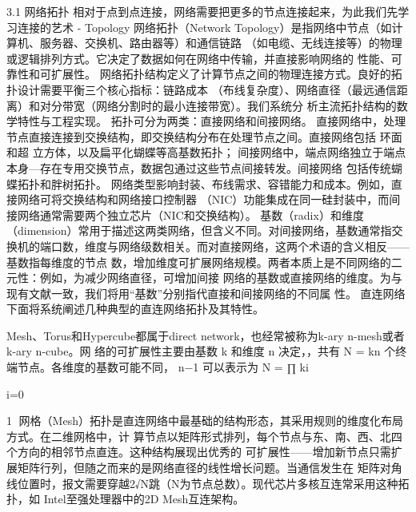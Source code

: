 
3.1 网络拓扑
相对于点到点连接，网络需要把更多的节点连接起来，为此我们先学习连接的艺术 - Topology
网络拓扑（Network Topology）是指网络中节点（如计算机、服务器、交换机、路由器等）和通信链路
（如电缆、无线连接等）的物理或逻辑排列方式。它决定了数据如何在网络中传输，并直接影响网络的
性能、可靠性和可扩展性。
网络拓扑结构定义了计算节点之间的物理连接方式。良好的拓扑设计需要平衡三个核心指标：链路成本
（布线复杂度）、网络直径（最远通信距离）和对分带宽（网络分割时的最小连接带宽）。我们系统分
析主流拓扑结构的数学特性与工程实现。
拓扑可分为两类：直接网络和间接网络。
直接网络中，处理节点直接连接到交换结构，即交换结构分布在处理节点之间。直接网络包括 环面和超
立方体，以及扁平化蝴蝶等高基数拓扑；
间接网络中，端点网络独立于端点本身—存在专用交换节点，数据包通过这些节点间接转发。间接网络
包括传统蝴蝶拓扑和胖树拓扑。
网络类型影响封装、布线需求、容错能力和成本。例如，直接网络可将交换结构和网络接口控制器
（NIC）功能集成在同一硅封装中，而间接网络通常需要两个独立芯片（NIC和交换结构）。
基数（radix）和维度（dimension）常用于描述这两类网络，但含义不同。对间接网络，基数通常指交
换机的端口数，维度与网络级数相关。而对直接网络，这两个术语的含义相反——基数指每维度的节点
数，增加维度可扩展网络规模。两者本质上是不同网络的二元性：例如，为减少网络直径，可增加间接
网络的基数或直接网络的维度。为与现有文献一致，我们将用“基数”分别指代直接和间接网络的不同属
性。
直连网络
下面将系统阐述几种典型的直连网络拓扑及其特性。

Mesh、Torus和Hypercube都属于direct network，也经常被称为k-ary n-mesh或者k-ary n-cube。网
络的可扩展性主要由基数 k 和维度 n 决定，，共有 N = kn 个终端节点。各维度的基数可能不同，
             n−1
可以表示为 N = ∏ ki     ​   ​




             i=0




                                                                       1
网格（Mesh）拓扑是直连网络中最基础的结构形态，其采用规则的维度化布局方式。在二维网格中，计
算节点以矩阵形式排列，每个节点与东、南、西、北四个方向的相邻节点直连。这种结构展现出优秀的
可扩展性——增加新节点只需扩展矩阵行列，但随之而来的是网络直径的线性增长问题。当通信发生在
矩阵对角线位置时，报文需要穿越2√N跳（N为节点总数）。现代芯片多核互连常采用这种拓扑，如
Intel至强处理器中的2D Mesh互连架构。



